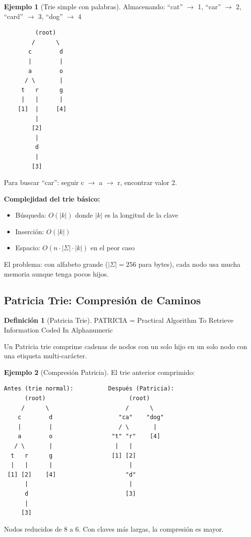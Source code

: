 \documentclass[11pt,a4paper,twoside,openright]{book}
\theoremstyle{definition}
\newtheorem{definition}{Definición}[chapter]
\newtheorem{example}{Ejemplo}[chapter]
\theoremstyle{plain}
\theoremstyle{remark}
\begin{document}
\begin{example}[Trie simple con palabras]
Almacenando: ``cat'' $\to$ 1, ``car'' $\to$ 2, ``card'' $\to$ 3, ``dog'' $\to$ 4

\begin{verbatim}
         (root)
        /      \
       c        d
       |        |
       a        o
      / \       |
     t   r      g
     |   |      |
    [1]  |     [4]
         |
        [2]
         |
         d
         |
        [3]
\end{verbatim}

Para buscar ``car'': seguir c $\to$ a $\to$ r, encontrar valor 2.
\end{example}

\begin{mathnote}
\textbf{Complejidad del trie básico:}
\begin{itemize}
    \item Búsqueda: $O(|k|)$ donde $|k|$ es la longitud de la clave
    \item Inserción: $O(|k|)$
    \item Espacio: $O(n \cdot |\Sigma| \cdot |k|)$ en el peor caso
\end{itemize}

El problema: con alfabeto grande ($|\Sigma| = 256$ para bytes), cada nodo usa mucha memoria aunque tenga pocos hijos.
\end{mathnote}

\subsection{Patricia Trie: Compresión de Caminos}

\begin{definition}[Patricia Trie]
PATRICIA = Practical Algorithm To Retrieve Information Coded In Alphanumeric

Un Patricia trie comprime cadenas de nodos con un solo hijo en un solo nodo con una etiqueta multi-carácter.
\end{definition}

\begin{example}[Compresión Patricia]
El trie anterior comprimido:

\begin{verbatim}
Antes (trie normal):          Después (Patricia):
      (root)                        (root)
     /      \                      /      \
    c        d                   "ca"    "dog"
    |        |                   / \       |
    a        o                 "t" "r"    [4]
   / \       |                  |   |
  t   r      g                 [1] [2]
  |   |      |                      |
 [1] [2]    [4]                    "d"
      |                             |
      d                            [3]
      |
     [3]
\end{verbatim}

Nodos reducidos de 8 a 6. Con claves más largas, la compresión es mayor.
\end{example}
\end{document}

